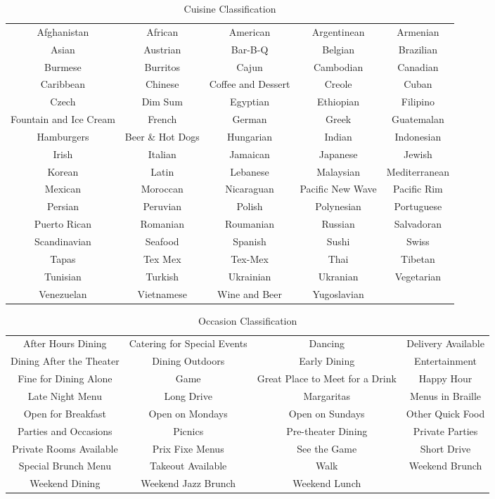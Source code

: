 \documentclass[letterpaper,10pt]{article}
\begin{document}
\begin{table}[h]
\centering
\caption{Cuisine Classification}
\begin{tabu}{ccccc}
Afghanistan & African & American & Argentinean & Armenian \\
Asian & Austrian & Bar-B-Q & Belgian & Brazilian \\
Burmese & Burritos & Cajun & Cambodian & Canadian \\
Caribbean & Chinese & Coffee and Dessert & Creole & Cuban \\
Czech & Dim Sum & Egyptian & Ethiopian & Filipino \\
Fountain and Ice Cream & French & German & Greek & Guatemalan \\
Hamburgers & Beer \& Hot Dogs & Hungarian & Indian & Indonesian \\
Irish & Italian & Jamaican & Japanese & Jewish \\
Korean & Latin & Lebanese & Malaysian & Mediterranean \\
Mexican & Moroccan & Nicaraguan & Pacific New Wave & Pacific Rim \\
Persian & Peruvian & Polish & Polynesian & Portuguese \\
Puerto Rican & Romanian & Roumanian & Russian & Salvadoran \\
Scandinavian & Seafood & Spanish & Sushi & Swiss \\
Tapas & Tex Mex & Tex-Mex & Thai & Tibetan \\
Tunisian & Turkish & Ukrainian & Ukranian & Vegetarian \\
Venezuelan & Vietnamese & Wine and Beer & Yugoslavian &  \\
\end{tabu}
\end{table}

\begin{table}[h]
\centering
\caption{Occasion Classification}
\begin{tabu}{cccc}
After Hours Dining & Catering for Special Events & Dancing & Delivery Available \\
Dining After the Theater & Dining Outdoors & Early Dining & Entertainment \\
Fine for Dining Alone & Game & Great Place to Meet for a Drink & Happy Hour \\
Late Night Menu & Long Drive & Margaritas & Menus in Braille \\
Open for Breakfast & Open on Mondays & Open on Sundays & Other Quick Food \\
Parties and Occasions & Picnics & Pre-theater Dining & Private Parties \\
Private Rooms Available & Prix Fixe Menus & See the Game & Short Drive \\
Special Brunch Menu & Takeout Available & Walk & Weekend Brunch \\
Weekend Dining & Weekend Jazz Brunch & Weekend Lunch &  \\
\end{tabu}
\end{table}
\end{document}

